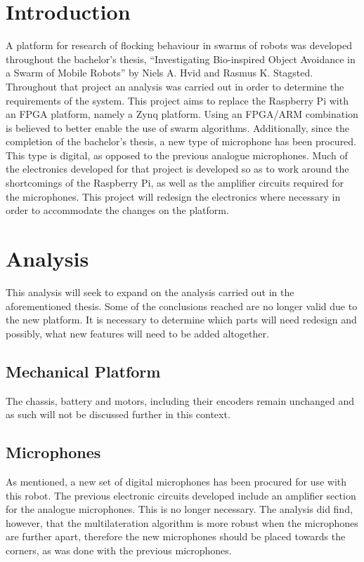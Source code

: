 
\section{Introduction}
A platform for research of flocking behaviour in swarms of robots was developed throughout the bachelor's thesis, ``Investigating Bio-inspired Object Avoidance in a Swarm of Mobile Robots'' by Niels A. Hvid and Rasmus K. Stagsted.
Throughout that project an analysis was carried out in order to determine the requirements of the system.
This project aims to replace the Raspberry Pi with an FPGA platform, namely a Zynq platform.
Using an FPGA/ARM combination is believed to better enable the use of swarm algorithms.
Additionally, since the completion of the bachelor's thesis, a new type of microphone has been procured.
This type is digital, as opposed to the previous analogue microphones.
Much of the electronics developed for that project is developed so as to work around the shortcomings of the Raspberry Pi, as well as the amplifier circuits required for the microphones.
This project will redesign the electronics where necessary in order to accommodate the changes on the platform.

\section{Analysis} %
\label{sec:analysis}
This analysis will seek to expand on the analysis carried out in the aforementioned thesis.
Some of the conclusions reached are no longer valid due to the new platform.
It is necessary to determine which parts will need redesign and possibly, what new features will need to be added altogether.

\subsection{Mechanical Platform} %
\label{sub:mechanical_platform}
The chassis, battery and motors, including their encoders remain unchanged and as such will not be discussed further in this context.

\subsection{Microphones} %
\label{sub:microphones}
As mentioned, a new set of digital microphones has been procured for use with this robot.
The previous electronic circuits developed include an amplifier section for the analogue microphones.
This is no longer necessary.
The analysis did find, however, that the multilateration algorithm is more robust when the microphones are further apart, therefore the new microphones should be placed towards the corners, as was done with the previous microphones.

